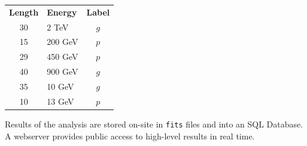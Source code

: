 \begin{multicols}{2}
\begin{center}
        \begin{streamblock}[equal height group=C, width=0.6\linewidth]{-5mm}{0mm}{}%
          \begin{multicols}{2}
            {\color{maincolor}
            \begin{tabularx}{\linewidth}{cXc}
              \rowcolor{gray!50}
                \textbf{Length} & \textbf{Energy} & \textbf{Label} \\
                30 & 2   TeV & $g$   \\
                15 & 200 GeV & $p$  \\
                29 & 450 GeV & $p$  \\
                40 & 900 GeV & $g$ \\
                35 & 10 GeV & $g$ \\
                10 & 13 GeV & $p$
            \end{tabularx}
            }

            \columnbreak

            Results of the analysis are stored on-site in \texttt{fits} files and into an SQL Database.
            A webserver provides public access to high-level results in real time.
          \end{multicols}
        \end{streamblock}%

        \vspace{5cm}

      \end{center}






\end{multicols}
